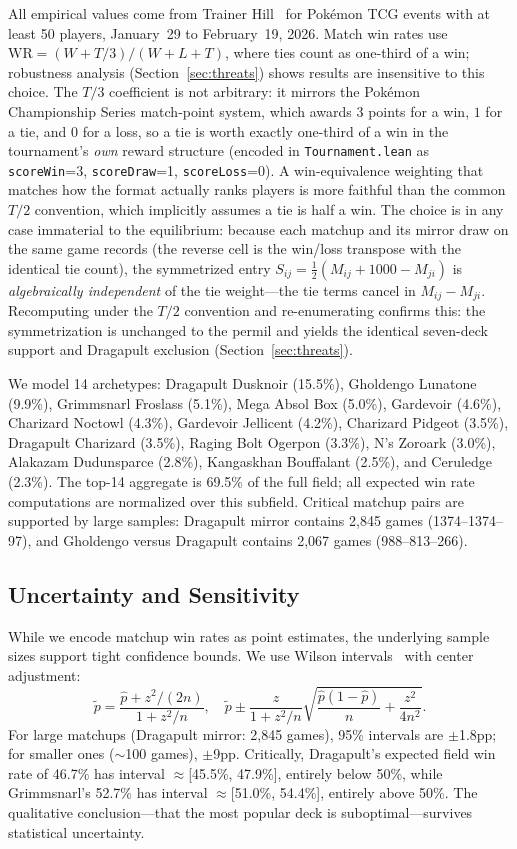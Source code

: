 \documentclass[journal]{IEEEtran}
\newif\ifhighlightchanges
\newcommand{\revised}[1]{\ifhighlightchanges\textcolor{blue!70!black}{#1}\else#1\fi}
\let\origsubsection\subsection
\renewcommand{\subsection}{\needspace{3\baselineskip}\origsubsection}
\begin{document}
All empirical values come from Trainer Hill~\cite{trainerhill2026} for Pok\'emon TCG events with at least 50 players, January~29 to February~19, 2026.
Match win rates use $\text{WR} = (W + T/3)/(W+L+T)$, where ties count as one-third of a win; robustness analysis (Section~\ref{sec:threats}) shows results are insensitive to this choice.
\revised{The $T/3$ coefficient is not arbitrary: it mirrors the Pok\'emon Championship Series match-point system, which awards $3$ points for a win, $1$ for a tie, and $0$ for a loss, so a tie is worth exactly one-third of a win in the tournament's \emph{own} reward structure (encoded in \texttt{Tournament.lean} as \texttt{scoreWin}=3, \texttt{scoreDraw}=1, \texttt{scoreLoss}=0).
A win-equivalence weighting that matches how the format actually ranks players is more faithful than the common $T/2$ convention, which implicitly assumes a tie is half a win.
The choice is in any case immaterial to the equilibrium: because each matchup and its mirror draw on the same game records (the reverse cell is the win/loss transpose with the identical tie count), the symmetrized entry $S_{ij}=\tfrac12(M_{ij}+1000-M_{ji})$ is \emph{algebraically independent} of the tie weight---the tie terms cancel in $M_{ij}-M_{ji}$.
Recomputing under the $T/2$ convention and re-enumerating confirms this: the symmetrization is unchanged to the permil and yields the identical seven-deck support and Dragapult exclusion (Section~\ref{sec:threats}).}

We model 14 archetypes:
Dragapult Dusknoir (15.5\%), Gholdengo Lunatone (9.9\%), Grimmsnarl Froslass (5.1\%), Mega Absol Box (5.0\%), Gardevoir (4.6\%), Charizard Noctowl (4.3\%), Gardevoir Jellicent (4.2\%), Charizard Pidgeot (3.5\%), Dragapult Charizard (3.5\%), Raging Bolt Ogerpon (3.3\%), N's Zoroark (3.0\%), Alakazam Dudunsparce (2.8\%), Kangaskhan Bouffalant (2.5\%), and Ceruledge (2.3\%).
The top-14 aggregate is 69.5\% of the full field; all expected win rate computations are normalized over this subfield.
Critical matchup pairs are supported by large samples: Dragapult mirror contains 2{,}845 games (1374--1374--97), and Gholdengo versus Dragapult contains 2{,}067 games (988--813--266).

\subsection{Uncertainty and Sensitivity}

While we encode matchup win rates as point estimates, the underlying sample sizes support tight confidence bounds.
We use Wilson intervals~\cite{Wilson1927} with center adjustment:
\[
\tilde{p}
=
\frac{\hat{p} + z^2/(2n)}{1 + z^2/n},
\quad
\tilde{p} \pm \frac{z}{1 + z^2/n}\!\sqrt{\frac{\hat{p}(1\!-\!\hat{p})}{n} + \frac{z^2}{4n^2}}.
\]
For large matchups (Dragapult mirror: 2{,}845 games), 95\% intervals are $\pm$1.8pp; for smaller ones (${\sim}$100 games), $\pm$9pp.
Critically, Dragapult's expected field win rate of 46.7\% has interval ${\approx}$[45.5\%, 47.9\%], entirely below 50\%, while Grimmsnarl's 52.7\% has interval ${\approx}$[51.0\%, 54.4\%], entirely above 50\%.
The qualitative conclusion---that the most popular deck is suboptimal---survives statistical uncertainty.
\end{document}
